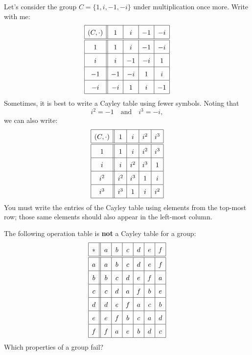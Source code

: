 \documentclass{ximera}
\begin{document}
\begin{example}
  Let's consider the group $C =\{1,i,-1,-i\}$ under multiplication once more.
  Write with me:
  \[
  \renewcommand{\arraystretch}{1.6}
  \begin{array}{|c||c|c|c|c|c|c|}\hline
    (C,\cdot)& 1     & i     & -1    & -i  \\  \hline\hline
    1        & 1     & i     & -1    & -i  \\  \hline
    i        & i     & -1    & -i    & 1   \\  \hline
    -1       & -1    & -i    & 1     & i   \\  \hline
    -i       & -i    & 1     & i     & -1  \\  \hline
  \end{array}
  \]
  Sometimes, it is best to write a Cayley table using fewer symbols.
  Noting that
  \[
  i^2 = -1 \quad\text{and}\quad i^3 = -i,
  \]
  we can also write:
  \[
  \renewcommand{\arraystretch}{1.6}
  \begin{array}{|c||c|c|c|c|c|c|}\hline
    (C,\cdot)& 1     & i     & i^2   & i^3 \\  \hline\hline
    1        & 1     & i     & i^2   & i^3 \\  \hline
    i        & i     & i^2   & i^3   & 1   \\  \hline
    i^2      & i^2   & i^3   & 1     & i   \\  \hline
    i^3      & i^3   & 1     & i     & i^2 \\  \hline
  \end{array}
  \]
  You must write the entries of the Cayley table using elements from
  the top-most row; those same elements should also appear in the
  left-most column.
\end{example}



\begin{exercise}
  The following operation table is \textbf{not} a Cayley table for a
  group:
  \[
  \renewcommand{\arraystretch}{1.6}
  \begin{array}{|c||c|c|c|c|c|c|}\hline
     * & a & b & c & d & e & f  \\  \hline\hline
    a  & a & b & c & d & e & f  \\  \hline
    b  & b & c & d & e & f & a  \\  \hline
    c  & c & d & a & f & b & e  \\  \hline
    d  & d & e & f & a & c & b  \\  \hline
    e  & e & f & b & c & a & d  \\  \hline
    f  & f & a & e & b & d & c  \\  \hline
    \end{array}
  \]
  Which properties of a group fail?
\end{exercise}
\end{document}

